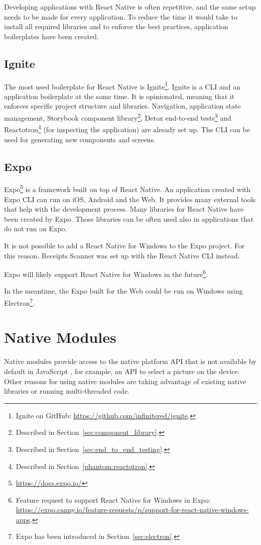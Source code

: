 \documentclass[
  printed, %
  table,   %
  oneside, %
  lof,     %
  lot,     %
]{fithesis3}
\begin{document}
Developing applications with React Native is often repetitive, and the same setup needs to be made for every application. To reduce the time it would take to install all required libraries and to enforce the best practices, application boilerplates have been created.

\subsection{Ignite}
The most used boilerplate for React Native is Ignite\footnote{Ignite on GitHub: \url{https://github.com/infinitered/ignite}.}.
Ignite is a CLI and an application boilerplate at the same time. It is opinionated, meaning that it enforces specific project structure and libraries. Navigation, application state management, Storybook component library\footnote{Described in Section~\ref{sec:component_library}.}, Detox end-to-end tests\footnote{Described in Section~\ref{sec:end_to_end_testing}.} and Reactotron\footnote{Described in Section~\ref{phantom:reactotron}.} (for inspecting the application) are already set up. The CLI can be used for generating new components and screens.

\subsection{Expo}
\label{sec:expo}
Expo\footnote{\url{https://docs.expo.io/}} is a framework built on top of React Native. An application created with Expo CLI can run on iOS, Android and the Web. It provides many external tools that help with the development process. 
Many libraries for React Native have been created by Expo. Those libraries can be often used also in applications that do not run on Expo.

It is not possible to add a React Native for Windows to the Expo project. For this reason, Receipts Scanner was set up with the React Native CLI instead.

Expo will likely support React Native for Windows in the future\footnote{Feature request to support React Native for Windows in Expo: \url{https://expo.canny.io/feature-requests/p/support-for-react-native-windows-apps}.}.

In the meantime, the Expo built for the Web could be run on Windows using Electron\footnote{Expo has been introduced in Section~\ref{sec:electron}.}.

\section{Native Modules}
Native modules provide access to the native platform API that is not available by default in JavaScript \cite{RNNativeModulesIntro}, for example, an API to select a picture on the device. Other reasons for using native modules are taking advantage of existing native libraries or running multi-threaded code.
\end{document}
